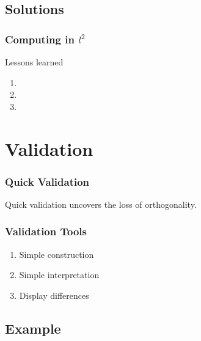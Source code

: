 \documentclass[handout]{beamer}
\begin{document}
{{{{%
\subsection{Solutions}
\begin{frame}      %
\frametitle{Computing in $l^{2}$}
  Lessons learned
  \begin{enumerate}
    \item {} 
    \item {}
    \item {}
  \end{enumerate}
  \dtwodots
\end{frame}
}}}}

\final

\section{Validation}

\begin{frame}
  \frametitle{Quick Validation}  %
  Quick validation uncovers the loss of orthogonality.
\end{frame}

\begin{frame}
  \frametitle{Validation Tools}  %
  \begin{enumerate}
    \item Simple construction
    \item Simple interpretation
    \item Display differences
  \end{enumerate}

\end{frame}


\subsection{Example}
\end{document}
